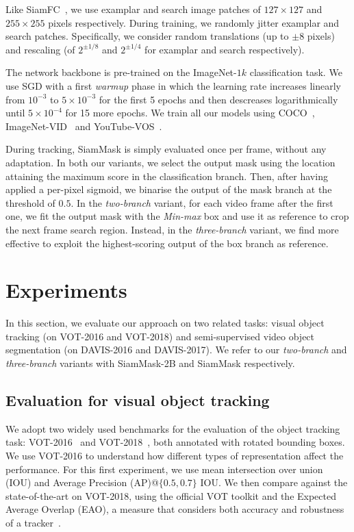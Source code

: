 \documentclass[10pt,twocolumn,letterpaper]{article}
\newcommand{\mypar}[1]{\smallskip\noindent {\bf #1}\enskip}
\begin{document}
\mypar{Training.}
Like SiamFC~\cite{bertinetto2016fully}, we use examplar and search image patches of $127{\times}127$ and $255{\times}255$ pixels respectively.
During training, we randomly jitter examplar and search patches.
Specifically, we consider random translations (up to $\pm 8$ pixels) and rescaling (of $2^{\pm 1/8}$ and $2^{\pm 1/4}$ for examplar and search respectively).

The network backbone is pre-trained on the \mbox{ImageNet-$1k$} classification task.
We use SGD with a first \emph{warmup} phase in which the learning rate increases linearly from $10^{-3}$ to $5{\times}10^{-3}$ for the first 5 epochs and then descreases logarithmically until $5{\times}10^{-4}$ for 15 more epochs.
We train all our models using COCO~\cite{lin2014microsoft}, ImageNet-VID~\cite{russakovsky2015imagenet} and YouTube-VOS~\cite{xu2018youtube}. 

\mypar{Inference.}
During tracking, SiamMask is simply evaluated once per frame, without any adaptation.
In both our variants, we select the output mask using the location attaining the maximum score in the classification branch.
Then, after having applied a per-pixel sigmoid, we binarise the output of the mask branch at the threshold of $0.5$.
In the \textit{two-branch} variant, for each video frame after the first one, we fit the output mask with the \emph{Min-max} box and use it as reference to crop the next frame search region.
Instead, in the \textit{three-branch} variant, we find more effective to exploit the highest-scoring output of the box branch as reference.

 
\section{Experiments}
\label{sec:experiments}
In this section, we evaluate our approach on two related tasks: visual object tracking (on VOT-2016 and VOT-2018) and semi-supervised video object segmentation (on DAVIS-2016 and DAVIS-2017).
We refer to our \emph{two-branch} and \emph{three-branch} variants with SiamMask-2B and SiamMask respectively.

\subsection{Evaluation for visual object tracking}
\label{sec:exp_track}

\mypar{Datasets and settings.}
We adopt two widely used benchmarks for the evaluation of the object tracking task: VOT-2016~\cite{kristan2016visual} and VOT-2018~\cite{VOT2018}, both annotated with rotated bounding boxes.
We use VOT-2016 to understand how different types of representation affect the performance.
For this first experiment, we use mean intersection over union (IOU) and Average Precision (AP)@$\{0.5,0.7\}$ IOU.
We then compare against the state-of-the-art on VOT-2018, using the official VOT toolkit and the Expected Average Overlap (EAO), a measure that considers both accuracy and robustness of a tracker~\cite{VOT2018}.
\end{document}
